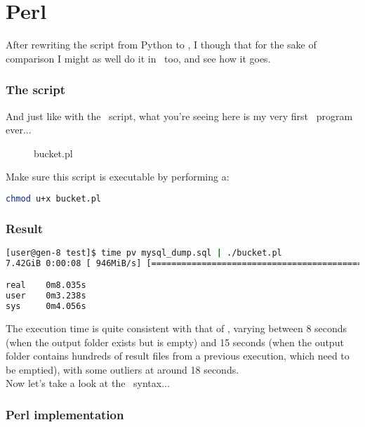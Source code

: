
\renewcommand{\currentPart}{Perl} 

\newpage
\part{Perl} \label{perl}

After rewriting the script from Python to \gawk, I though that for the sake of comparison I might as well do it in \perl\ too, and see how it goes.

\section*{The script}

And just like with the \gawk\ script, what you're seeing here is my very first \perl\ program ever... 

\begin{figure}[h]
	\caption{bucket.pl}
	
\end{figure}


\newpage
Make sure this script is executable by performing a:
\begin{lstlisting}[language=sh]
chmod u+x bucket.pl
\end{lstlisting}

\section*{Result}

\begin{lstlisting}[language=sh]
[user@gen-8 test]$ time pv mysql_dump.sql | ./bucket.pl
7.42GiB 0:00:08 [ 946MiB/s] [====================================================>] 100%

real	0m8.035s
user	0m3.238s
sys		0m4.056s
\end{lstlisting}

The execution time is quite consistent with that of \gawk, varying between 8 seconds (when the output folder exists but is empty) and 15 seconds (when the output folder contains hundreds of result files from a previous execution, which need to be emptied), with some outliers at around 18 seconds. \\


Now let's take a look at the \perl\ syntax...


\section*{Perl implementation}

